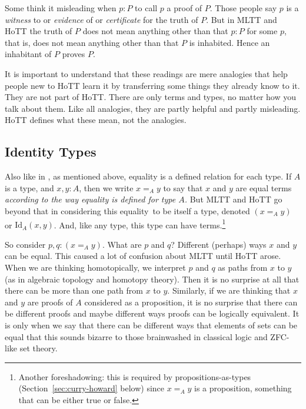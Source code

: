 \documentclass[11pt]{article}
\begin{document}
Some think it misleading when $p : P$ to call $p$ a proof of $P$.
Those people say $p$ is
a \emph{witness} to or \emph{evidence} of or \emph{certificate} for
the truth of $P$.  But in MLTT
and HoTT the truth of $P$ does not mean anything other than that $p : P$ for
some $p$, that is, does not mean anything other than that $P$ is inhabited.
Hence an inhabitant of $P$ proves $P$.

It is important to understand that these readings are mere analogies
that help people new to HoTT learn it by transferring some things they
already know to it.
They are not part of HoTT.  There are only terms and types, no matter
how you talk about them.  Like all analogies, they are partly helpful
and partly misleading.  HoTT defines what these mean, not the analogies.

\subsection{Identity Types}
\label{sec:identity}

Also like in \citet{bishop}, as mentioned above, equality is a defined
relation for each type.
If $A$ is a type, and $x, y : A$, then we write $x =_A y$ to say that
$x$ and $y$ are equal terms \emph{according to the way equality is defined
for type $A$.}  But MLTT and HoTT go beyond that in considering this equality\
to be itself a type, denoted $(x =_A y)$ or $\text{Id}_A(x, y)$.
And, like any type, this type can have terms.\footnote{Another foreshadowing:
this is required by propositions-as-types (Section~\ref{sec:curry-howard}
below) since $x =_A y$ is a proposition,
something that can be either true or false.}

So consider $p, q : (x =_A y)$.
What are $p$ and $q$?  Different (perhaps) ways $x$ and $y$ can be equal.
This caused a lot of confusion about MLTT until HoTT arose.
When we are thinking homotopically, we interpret $p$ and $q$ as paths
from $x$ to $y$ (as in algebraic topology and homotopy theory).  Then
it is no surprise at all that there can be more than one path from $x$
to $y$.  Similarly, if we are thinking that $x$ and $y$ are proofs of
$A$ considered as a proposition, it is no surprise that there can be
different proofs and maybe different ways proofs can be logically equivalent.
It is only when we say that there can be different ways that elements
of sets can be equal that this sounds bizarre to those brainwashed in
classical logic and ZFC-like set theory.
\end{document}
